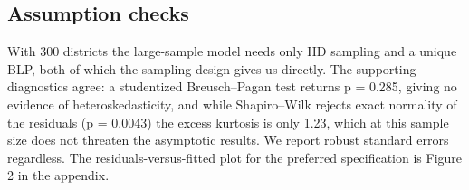 \documentclass[
]{article}
\begin{document}
\subsection{Assumption checks}\label{assumption-checks}

With 300 districts the large-sample model needs only IID sampling and a
unique BLP, both of which the sampling design gives us directly. The
supporting diagnostics agree: a studentized Breusch--Pagan test returns
p = 0.285, giving no evidence of heteroskedasticity, and while
Shapiro--Wilk rejects exact normality of the residuals (p = 0.0043) the
excess kurtosis is only 1.23, which at this sample size does not
threaten the asymptotic results. We report robust standard errors
regardless. The residuals-versus-fitted plot for the preferred
specification is Figure 2 in the appendix.
\end{document}
